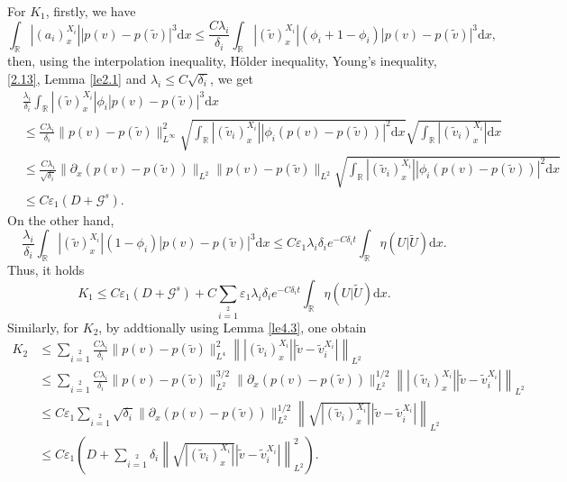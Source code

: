 \documentclass[10pt,reqno]{amsart}
\numberwithin{equation}{section}
\newcommand{\dif}{\mathrm{d}}
\begin{document}
For $K_1$, firstly, we have
\[
\int_\mathbb{R}|(a_i)^{X_i}_x||p(v)-p(\widetilde{v})|^3\dif x
\le \frac{C\lambda_i}{\delta_i}\int_\mathbb{R}|(\widetilde v)^{X_i}_x|(\phi_i+1-\phi_i)|p(v)-p(\widetilde{v})|^3\dif x,
\]
then, using the interpolation inequality, H\"{o}lder inequality, Young's inequality,  \eqref{2.13}, Lemma \ref{le2.1} and $\lambda_i\le C\sqrt{\delta_i}$, we get
\begin{align*}
&\frac{\lambda_i}{\delta_i}\int_\mathbb{R}|(\widetilde v)^{X_i}_x|\phi_i|p(v)-p(\widetilde{v})|^3\dif x\\
&\le \frac{C\lambda_i}{\delta_i}\|p(v)-p(\widetilde{v})\|^2_{L^{\infty}}
\sqrt{\int_\mathbb{R}|(\widetilde{v}_i)^{X_i}_x||\phi_i(p(v)-p(\widetilde{v}))|^2\dif x}
\sqrt{\int_\mathbb{R}|(\widetilde{v}_i)^{X_i}_x|\dif x}\\
&\le \frac{C\lambda_i}{\sqrt{\delta_i}}\|\partial_x(p(v)-p(\widetilde{v}))\|_{L^{2}}
\|p(v)-p(\widetilde{v})\|_{L^{2}}
\sqrt{\int_\mathbb{R}|(\widetilde{v}_i)^{X_i}_x||\phi_i(p(v)-p(\widetilde{v}))|^2\dif x}\\
&\le C\varepsilon_1(D+\mathcal{G}^s).
\end{align*}
On the other hand,
\[
\frac{\lambda_i}{\delta_i}\int_\mathbb{R}|(\widetilde v)^{X_i}_x|(1-\phi_i)|p(v)-p(\widetilde{v})|^3\dif x
\le C\varepsilon_1\lambda_i\delta_ie^{-C\delta_i t}\int_\mathbb{R}\eta(U|\widetilde{U})\dif x.
\]
Thus, it holds
\[
K_1\le C\varepsilon_1(D+\mathcal{G}^s)+C\sum\limits_{i=1}\limits^2\varepsilon_1\lambda_i\delta_ie^{-C\delta_i t}\int_\mathbb{R}\eta(U|\widetilde{U})\dif x.
\]
Similarly, for $K_2$, by addtionally using Lemma \ref{le4.3}, one obtain
\begin{align*}
K_2&\le\sum\limits_{i=1}\limits^2\frac{C\lambda_i}{\delta_i}\|p(v)-p(\widetilde{v})\|_{L^4}^2
\left\||(\widetilde{v}_i)^{X_i}_x||\widetilde{v}-\widetilde{v}_i^{X_i}|\right\|_{L^2}\\
&\le \sum\limits_{i=1}\limits^2\frac{C\lambda_i}{\delta_i}\|p(v)-p(\widetilde{v})\|_{L^2}^{3/2}
\|\partial_x(p(v)-p(\widetilde{v}))\|_{L^2}^{1/2}
\left\||(\widetilde{v}_i)^{X_i}_x||\widetilde{v}-\widetilde{v}_i^{X_i}|\right\|_{L^2}\\
&\le C\varepsilon_1\sum\limits_{i=1}\limits^2\sqrt{\delta_i}
\|\partial_x(p(v)-p(\widetilde{v}))\|_{L^2}^{1/2}
\left\|\sqrt{|(\widetilde{v}_i)^{X_i}_x|}|\widetilde{v}-\widetilde{v}_i^{X_i}|\right\|_{L^2}\\
&\le C\varepsilon_1\left(D
+\sum\limits_{i=1}\limits^2\delta_i\left\|\sqrt{|(\widetilde{v}_i)^{X_i}_x|}|\widetilde{v}-\widetilde{v}_i^{X_i}|\right\|_{L^2}^2\right).
\end{align*}
\end{document}
